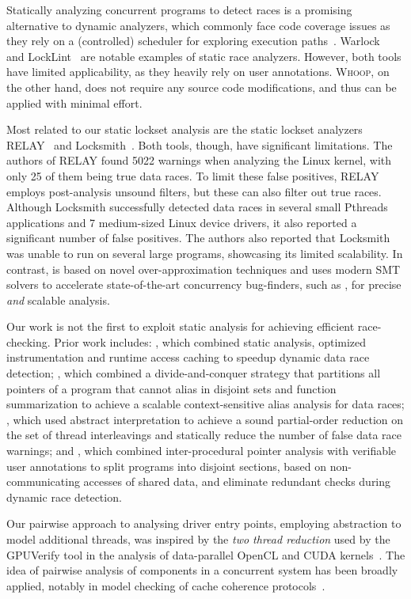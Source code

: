 Statically analyzing concurrent programs to detect races is a promising alternative to dynamic analyzers, which commonly face code coverage issues as they rely on a (controlled) scheduler for exploring execution paths~\cite{musuvathi2008finding}. Warlock~\cite{sterling1993warlock} and LockLint~\cite{oracle2010locklint} are notable examples of static race analyzers. However, both tools have limited applicability, as they heavily rely on user annotations. \textsc{Whoop}, on the other hand, does not require any source code modifications, and thus can be applied with minimal effort.

Most related to our static lockset analysis are the static lockset analyzers RELAY~\cite{voung2007relay} and Locksmith~\cite{pratikakis2006locksmith}. Both tools, though, have significant limitations. The authors of RELAY found 5022 warnings when analyzing the Linux kernel, with only 25 of them being true data races. To limit these false positives, RELAY employs post-analysis unsound filters, but these can also filter out true races. Although Locksmith successfully detected data races in several small Pthreads applications and 7 medium-sized Linux device drivers, it also reported a significant number of false positives. The authors also reported that Locksmith was unable to run on several large programs, showcasing its limited scalability. In contrast, \whoop is based on novel over-approximation techniques and uses modern SMT solvers to accelerate state-of-the-art concurrency bug-finders, such as \corral, for precise \emph{and} scalable analysis.

Our work is not the first to exploit static analysis for achieving efficient race-checking. Prior work includes: \cite{choi2002efficient}, which combined static analysis, optimized instrumentation and runtime access caching to speedup dynamic data race detection; \cite{kahlon2007fast}, which combined a divide-and-conquer strategy that partitions all pointers of a program that cannot alias in disjoint sets and function summarization to achieve a scalable context-sensitive alias analysis for data races; \cite{kahlon2009semantic}, which used abstract interpretation to achieve a sound partial-order reduction on the set of thread interleavings and statically reduce the number of false data race warnings; and \cite{das2015section}, which combined inter-procedural pointer analysis with verifiable user annotations to split programs into disjoint sections, based on non-communicating accesses of shared data, and eliminate redundant checks during dynamic race detection.

Our pairwise approach to analysing driver entry points, employing abstraction to model additional threads, was inspired by the \emph{two thread reduction} used by the GPUVerify tool in the analysis of data-parallel OpenCL and CUDA kernels~\cite{gpuverify,bardsley2014engineering}.  The idea of pairwise analysis of components in a concurrent system has been broadly applied, notably in model checking of cache coherence protocols~\cite{mcmillan1999verification}.

